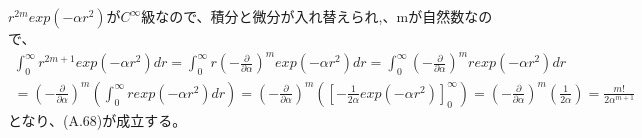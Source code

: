 \documentclass{jsarticle}
\begin{document}
$r^{2m} exp(-\alpha r^2)$が$C^{\infty}$級なので、積分と微分が入れ替えられ,、mが自然数なので、
\begin{equation}
\begin{split}
\int_{0}^{\infty} r^{2m+1} exp(-\alpha r^2) dr = \int_{0}^{\infty} r (-\frac{\partial}{\partial\alpha})^{m} exp(-\alpha r^2) dr
= \int_{0}^{\infty}  (-\frac{\partial}{\partial\alpha})^{m} r exp(-\alpha r^2) dr\\
= (-\frac{\partial}{\partial\alpha})^{m} (\int_{0}^{\infty}  r exp(-\alpha r^2) dr)
= (-\frac{\partial}{\partial\alpha})^{m} ([-\frac{1}{2\alpha} exp(-\alpha r^2)]_{0}^{\infty})
= (-\frac{\partial}{\partial\alpha})^{m} (\frac{1}{2\alpha})
=\frac{m!}{2\alpha^{m+1}}
\end{split}
\end{equation}
となり、(A.68)が成立する。
\end{document}

